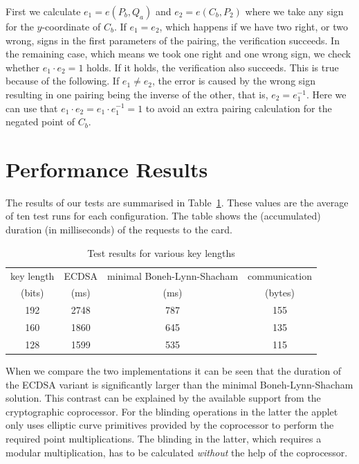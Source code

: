First we calculate $e_1 = e(P_b, Q_a)$ and $e_2 = e(C_b, P_2)$ where we take
any sign for the $y$-coordinate of $C_b$. If $e_1 = e_2$, which happens if we
have two right, or two wrong, signs in the first parameters of the pairing, the
verification succeeds. In the remaining case, which means we took one right and
one wrong sign, we check whether $e_1 \cdot e_2 = 1$ holds. If it holds, the
verification also succeeds. This is true because of the following. If
$e_1 \neq e_2$, the error is caused by the wrong sign resulting in one pairing
being the inverse of the other, that is, $e_2 = e_1^{-1}$. Here we can use that
$e_1 \cdot e_2 = e_1 \cdot e_1^{-1} = 1$ to avoid an extra pairing calculation
for the negated point of $C_b$.

\section{Performance Results}

The results of our tests are summarised in Table~\ref{tab:sbc-results}. These
values are the average of ten test runs for each configuration. The table shows
the (accumulated) duration (in milliseconds) of the requests to the card.

\begin{table}[b]
  \centering
  \caption{Test results for various key lengths}
  \label{tab:sbc-results}
  \renewcommand{\tabcolsep}{1.25mm}
  \renewcommand{\arraystretch}{1.25}
  \begin{tabular}{| c || c | c || c |}\hline
    key length & ECDSA & minimal Boneh-Lynn-Shacham & communication \\
    (bits) & (ms) & (ms) & (bytes) \\\hline\hline
    192 & 2748 & 787 & 155 \\\hline
    160 & 1860 & 645 & 135 \\\hline
    128 & 1599 & 535 & 115 \\\hline
  \end{tabular}
\end{table}

When we compare the two implementations it can be seen that the duration of the
ECDSA variant is significantly larger than the minimal Boneh-Lynn-Shacham
solution. This contrast can be explained by the available support from the
cryptographic coprocessor. For the blinding operations in the latter the applet
only uses elliptic curve primitives provided by the coprocessor to perform the
required point multiplications. The blinding in the latter, which requires a
modular multiplication, has to be calculated \emph{without} the help of the
coprocessor.

